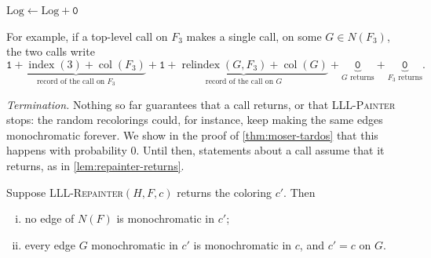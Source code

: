 \begin{algorithm}[H]
    \caption{\textsc{LLL-Repainter}\((H, F, c)\)}\label{alg:lll-repainter}
    \(\mathrm{Log} \gets \mathrm{Log} + \texttt{0}\) 
     
\end{algorithm}

For example, if a top-level call on \(F_{3}\) makes a single call, on some \(G \in N(F_{3})\), the two calls write
\[
    \underbrace{\texttt{1} + \operatorname{index}(3) + \operatorname{col}(F_{3})}_{\text{record of the call on } F_{3}}
    + \underbrace{\texttt{1} + \operatorname{relindex}(G, F_{3}) + \operatorname{col}(G)}_{\text{record of the call on } G}
    + \underbrace{\texttt{0}}_{G \text{ returns}} + \underbrace{\texttt{0}}_{F_{3} \text{ returns}} .
\]

\emph{Termination.} Nothing so far guarantees that a call returns, or that \textsc{LLL-Painter} stops: the random recolorings could, for instance, keep making the same edges monochromatic forever. We show in the proof of \autoref{thm:moser-tardos} that this happens with probability \(0\). Until then, statements about a call assume that it returns, as in \autoref{lem:repainter-returns}.

\begin{lemma}\label{lem:repainter-returns}
    Suppose \textsc{LLL-Repainter}\((H, F, c)\) returns the coloring \(c'\). Then
    \begin{enumerate}[(i)]
        \item no edge of \(N(F)\) is monochromatic in \(c'\);
        \item every edge \(G\) monochromatic in \(c'\) is monochromatic in \(c\), and \(c' = c\) on \(G\).
    \end{enumerate}
\end{lemma}

